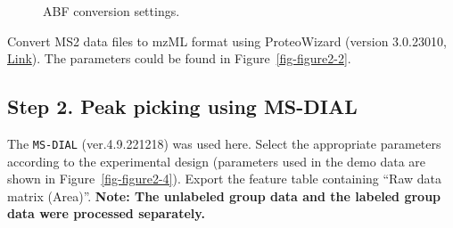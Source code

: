 \documentclass[
  letterpaper,
  DIV=11,
  numbers=noendperiod]{scrreprt}
\begin{document}
\begin{figure}


\caption{\label{fig-figure2-3}ABF conversion settings.}

\end{figure}%

Convert MS2 data files to mzML format using ProteoWizard (version
3.0.23010, \href{https://proteowizard.sourceforge.io/}{Link}). The
parameters could be found in Figure~\ref{fig-figure2-2}.

\subsection{Step 2. Peak picking using
MS-DIAL}\label{step-2.-peak-picking-using-ms-dial}

The \texttt{MS-DIAL} (ver.4.9.221218) was used here. Select the
appropriate parameters according to the experimental design (parameters
used in the demo data are shown in Figure~\ref{fig-figure2-4}). Export
the feature table containing ``Raw data matrix (Area)''. \textbf{Note:
The unlabeled group data and the labeled group data were processed
separately.}
\end{document}
